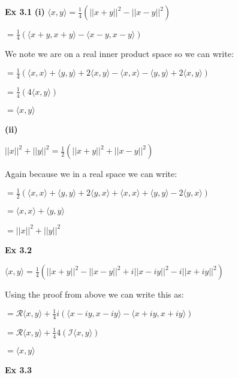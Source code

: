\documentclass[letterpaper,12pt]{article}
\theoremstyle{definition}
\begin{document}
	\begin{spacing}{1.3}{}
		\vspace{1 mm}
	
	\textbf{Ex 3.1}
	\setlength{\leftskip}{10pt}
	\textbf{(i)}
	\setlength{\leftskip}{20pt}
	$\langle x, y \rangle = \frac{1}{4}(||x + y||^2 - ||x - y||^2)$
	
	$= \frac{1}{4}(\langle x + y, x + y \rangle - \langle x - y, x - y \rangle)$
	
	We note we are on a real inner product space so we can write:
	
	$= \frac{1}{4}(\langle x, x \rangle + \langle y, y \rangle + 2\langle x, y \rangle - \langle x, x \rangle - \langle y, y \rangle + 2\langle x, y \rangle)$
	
	$= \frac{1}{4}(4\langle x, y \rangle)$
	
	$= \langle x, y \rangle$
	
	\setlength{\leftskip}{10pt}
	
	\textbf{(ii)}
	
	\setlength{\leftskip}{20pt}
	
	$||x||^2 + ||y||^2 = \frac{1}{2}(||x + y||^2 + ||x - y||^2)$
	
	Again because we in a real space we can write:
	
	$= \frac{1}{2}(\langle x, x \rangle + \langle y, y \rangle + 2\langle y, x \rangle + \langle x, x \rangle + \langle y, y \rangle - 2\langle y, x \rangle)$
	
	$= \langle x, x \rangle + \langle y, y \rangle$
	
	$= ||x||^2 + ||y||^2$
	
	\setlength{\leftskip}{0pt}
	
	\textbf{Ex 3.2}
	
	\setlength{\leftskip}{20pt}
	
	$\langle x, y \rangle = \frac{1}{4}(||x + y||^2 - ||x - y||^2 + i||x - iy||^2 - i||x + iy||^2)$
	
	Using the proof from above we can write this as:
	
	$= \mathcal{R} \langle x, y \rangle +\frac{1}{4}i(\langle x-iy, x-iy \rangle - \langle x+iy, x+iy \rangle)$
	
	$= \mathcal{R} \langle x, y \rangle +\frac{1}{4}4( \mathcal{I} \langle x, y \rangle)$
	
	$= \langle x, y \rangle$
	
	\setlength{\leftskip}{0pt}
	
	\textbf{Ex 3.3}
	
	\setlength{\leftskip}{10pt}
	

\end{spacing}
\end{document}
